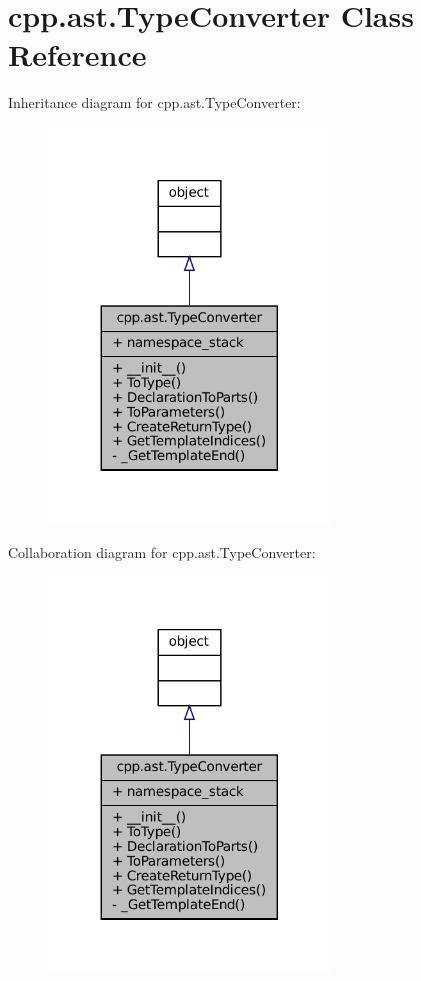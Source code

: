 \hypertarget{classcpp_1_1ast_1_1TypeConverter}{}\section{cpp.\+ast.\+Type\+Converter Class Reference}
\label{classcpp_1_1ast_1_1TypeConverter}


Inheritance diagram for cpp.\+ast.\+Type\+Converter\+:
\nopagebreak
\begin{figure}[H]
\begin{center}
\leavevmode
\includegraphics[width=212pt]{classcpp_1_1ast_1_1TypeConverter__inherit__graph}
\end{center}
\end{figure}


Collaboration diagram for cpp.\+ast.\+Type\+Converter\+:
\nopagebreak
\begin{figure}[H]
\begin{center}
\leavevmode
\includegraphics[width=212pt]{classcpp_1_1ast_1_1TypeConverter__coll__graph}
\end{center}
\end{figure}
